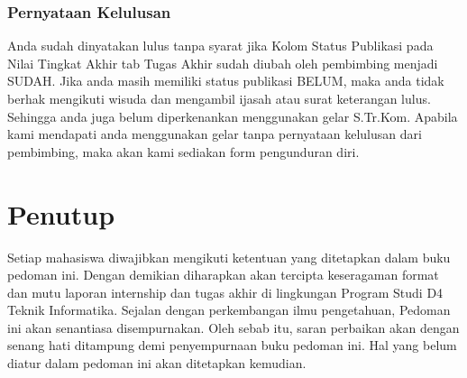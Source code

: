\subsection{Pernyataan Kelulusan}
Anda sudah dinyatakan lulus tanpa syarat jika Kolom Status Publikasi pada Nilai Tingkat Akhir tab Tugas Akhir sudah diubah oleh pembimbing menjadi SUDAH. Jika anda masih memiliki status publikasi BELUM, maka anda tidak berhak mengikuti wisuda dan mengambil ijasah atau surat keterangan lulus. Sehingga anda juga belum diperkenankan menggunakan gelar S.Tr.Kom. Apabila kami mendapati anda menggunakan gelar tanpa pernyataan kelulusan dari pembimbing, maka akan kami sediakan form pengunduran diri.


\chapter{Penutup}

Setiap mahasiswa  diwajibkan mengikuti ketentuan yang ditetapkan dalam buku pedoman ini. Dengan demikian diharapkan akan tercipta keseragaman format dan mutu laporan internship dan tugas akhir di lingkungan Program Studi D4 Teknik Informatika. Sejalan dengan perkembangan ilmu pengetahuan, Pedoman ini akan senantiasa disempurnakan. Oleh sebab itu, saran perbaikan akan dengan senang hati ditampung demi penyempurnaan buku pedoman ini. Hal yang belum diatur dalam pedoman ini akan ditetapkan kemudian.
